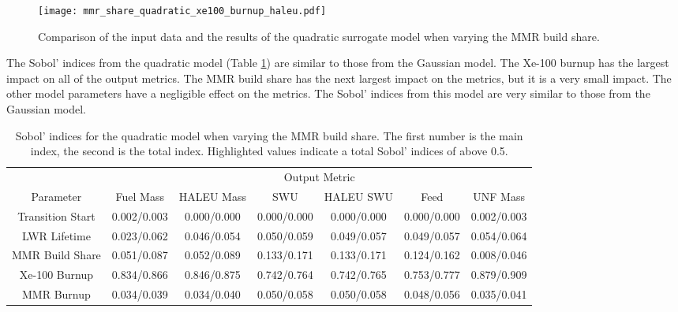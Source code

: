 \begin{figure}[h!]
    \centering 
    \texttt{[image: mmr\_share\_quadratic\_xe100\_burnup\_haleu.pdf]}
    \caption{Comparison of the input data and the results of the quadratic 
    surrogate model when varying the MMR build share.}
    \label{fig:s7_mmr_quadratic}
\end{figure}

The Sobol' indices from the quadratic model (Table 
\ref{tab:s7_sobol_mmr_quadratic}) are similar to those from the 
Gaussian model. The Xe-100 burnup has the largest impact on all of the 
output metrics. The \gls{MMR} build share has the next largest impact 
on the metrics, but it is a very small impact. The other model 
parameters have a negligible effect on the metrics. The Sobol' 
indices from this model are very similar to those from the Gaussian 
model. 

\begin{table}[h!]
    \centering
    \caption{Sobol' indices for the quadratic model when varying the MMR 
    build share. The first number is the main index, the second is the total 
    index. Highlighted 
    values indicate a total Sobol' indices of above 0.5.}
    \label{tab:s7_sobol_mmr_quadratic}
    \begin{tabular}{c c c c c c c}
        \hline
        & \multicolumn{6}{c}{Output Metric} \\
        Parameter & Fuel Mass & HALEU Mass & SWU & HALEU SWU & Feed & UNF Mass \\
        \hline
        Transition Start & 0.002/0.003 & 0.000/0.000 & 0.000/0.000 &
                        0.000/0.000 & 0.000/0.000 & 0.002/0.003\\
        LWR Lifetime & 0.023/0.062 & 0.046/0.054 & 0.050/0.059 &
                       0.049/0.057 & 0.049/0.057 & 0.054/0.064\\
        MMR Build Share & 0.051/0.087 & 0.052/0.089 & 0.133/0.171 &
                          0.133/0.171 & 0.124/0.162 & 0.008/0.046\\
        Xe-100 Burnup & \cellcolor{green!25}0.834/0.866 & \cellcolor{green!25}0.846/0.875 & \cellcolor{green!25}0.742/0.764 &
        \cellcolor{green!25}0.742/0.765 & \cellcolor{green!25}0.753/0.777 & \cellcolor{green!25}0.879/0.909\\
        MMR Burnup & 0.034/0.039 & 0.034/0.040 & 0.050/0.058 & 
                     0.050/0.058 & 0.048/0.056 & 0.035/0.041\\
        \hline        
    \end{tabular}
\end{table}

